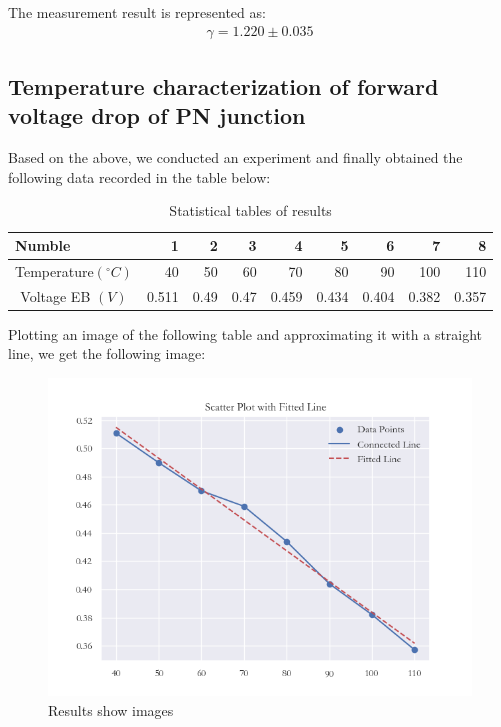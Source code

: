 \documentclass[UTF8]{article}
\begin{document}
    The measurement result is represented as:
    \begin{eqnarray}
    \gamma=1.220 \pm 0.035
    \end{eqnarray}
            
\subsection{Temperature characterization of forward voltage drop of PN junction}
Based on the above, we conducted an experiment and finally obtained the following data recorded in the table below:
\begin{table}[H]
  \centering
  \caption{Statistical tables of results}
    \begin{tabular}{crrrrrrrr}
    \toprule[2pt]
    \multicolumn{1}{l}{Numble} & 1     & 2     & 3     & 4     & 5     & 6 & 7 & 8 \\
    \midrule
    \multicolumn{1}{l}{Temperature$(^{\circ}C)$} & 40    & 50    & 60    & 70    & 80    & 90    & 100   & 110 \\
    Voltage EB $(V)$& 0.511 & 0.49  & 0.47  & 0.459 & 0.434 & 0.404 & 0.382 & 0.357 \\
    \bottomrule[2pt]
    \end{tabular}%
  \label{tab:addlabel}%
\end{table}%

Plotting an image of the following table and approximating it with a straight line, we get the following image:

	\begin{figure}[H]
    	\centering
    	\includegraphics[clip,scale=0.8,trim={0 0 0 0}]{fig/fig9.png}
        \caption{Results show images}
        \label{figure.2}
            \end{figure}
            
\end{document}
